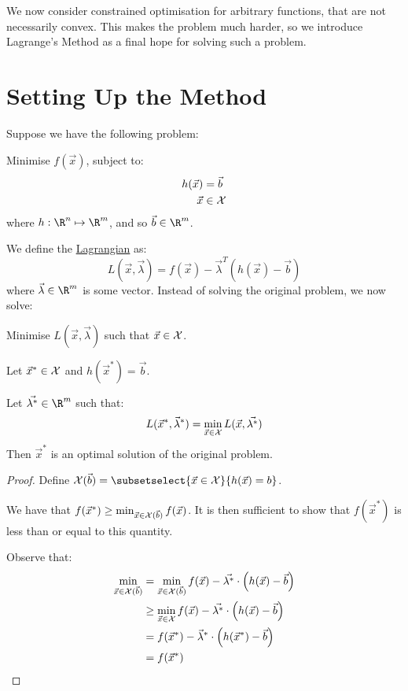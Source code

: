 \documentclass[../Main.tex]{subfiles}
\begin{document}
We now consider constrained optimisation for arbitrary functions, that are not necessarily convex. This makes the problem much harder, so we introduce Lagrange's Method as a final hope for solving such a problem.
\section{Setting Up the Method}
Suppose we have the following problem:

Minimise $f(\vec{x})$, subject to:
\begin{align*}
    h(\vec{x}) &= \vec{b} \\
    \vec{x} &\in \mathcal{X}
\end{align*}
where $h : \R^n \mapsto \R^m$, and so $\vec{b} \in \R^m$.

We define the \underline{Lagrangian} as:
\begin{equation*}
    L(\vec{x}, \vec{\lambda}) = f(\vec{x}) - \vec{\lambda}^T (h(\vec{x}) - \vec{b})
\end{equation*}
where $\vec{\lambda} \in \R^m$ is some vector. Instead of solving the original problem, we now solve:

Minimise $L(\vec{x}, \vec{\lambda})$ such that $\vec{x} \in \mathcal{X}$.
\begin{theorem}
    Let $\vec{x}^* \in \mathcal{X}$ and $h(\vec{x}^*) = \vec{b}$.

    Let $\vec{\lambda^*} \in \R^m$ such that:
    \begin{equation*}
        L(\vec{x}^*, \vec{\lambda}^*) = \min_{\vec{x} \in \mathcal{X}} L(\vec{x}, \vec{\lambda^*})
    \end{equation*}
    Then $\vec{x}^*$ is an optimal solution of the original problem.
\end{theorem}
\begin{proof}
    Define $\Xset(\vec{b}) = \subsetselect{\vec{x} \in \Xset}{h(\vec{x}) = b}$.

    We have that $f(\vec{x}^*) \geq \min_{\vec{x} \in \mathcal{X}(\vec{b})} f(\vec{x})$. It is then sufficient to show that $f(\vec{x}^*)$ is less than or equal to this quantity.

    Observe that:
    \begin{align*}
        \min_{\vec{x} \in \mathcal{X}(\vec{b})} &= \min_{\vec{x} \in \mathcal{X}(\vec{b})} f(\vec{x}) - \vec{\lambda^*} \cdot \left(h(\vec{x}) - \vec{b}\right) \\
        &\geq \min_{\vec{x} \in \mathcal{X}} f(\vec{x}) - \vec{\lambda^*} \cdot \left(h(\vec{x}) - \vec{b}\right) \\
        &= f(\vec{x}^*) - \vec{\lambda}^* \cdot \left(h(\vec{x}^*) - \vec{b}\right) \\
        &= f(\vec{x}^*)
    \end{align*}
\end{proof}
\end{document}
